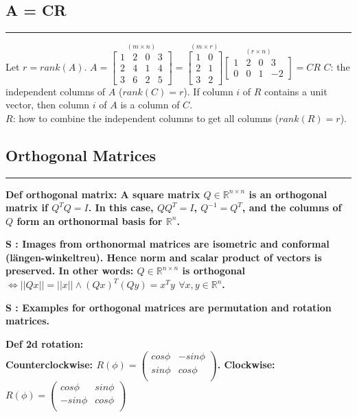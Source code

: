 \documentclass[7pt,landscape, margin = 0.1mm]{article}
\newcommand*{\mysubsection}[1]{\vspace{-2mm}\color{chaptercolor}\subsection{ #1 }
\vspace{-1mm}\hrule\vspace{1.5mm}\color{black}
\vspace{2mm}}
\newcommand{\DEF}[2]{\color{chaptercolor}\bf{Def #1}:\color{black}    \hspace{0.2cm} #2}
\newcommand{\SA}[2]{\color{chaptercolor}\bf{S #1}:\color{black}    \hspace{0.2cm} #2}
\begin{document}
\begin{multicols}{4}
\begin{flushleft}
{{\mysubsection{A = CR}
Let $r=rank(A)$.
$A=\stackrel{(m \times n)}{\begin{bmatrix}
1 & 2 & 0 & 3\\
2 & 4 & 1 & 4\\
3 & 6 & 2 & 5
\end{bmatrix}}=\stackrel{(m \times r)}{\begin{bmatrix}
1 & 0\\
2 & 1\\
3 & 2
\end{bmatrix}}\stackrel{(r \times n)}{\begin{bmatrix}
1 & 2 & 0 & 3\\
0 & 0 & 1 & -2
\end{bmatrix}}=CR$
$C$: the independent columns of $A$ ($rank(C)=r$). If column $i$ of $R$ contains a unit vector, then column $i$ of $A$ is a column of $C$.\\
$R$: how to combine the independent columns to get all columns ($rank(R)=r$).


\mysubsection{\centering Orthogonal Matrices}
\DEF{orthogonal matrix}{A square matrix $Q\in\mathbb{R}^{n\times n}$ is an orthogonal matrix if $Q^TQ=I$. In this case, $QQ^T=I$, $Q^{-1}=Q^T$, and the columns of $Q$ form an orthonormal basis for $\mathbb{R}^n$.}

\SA{}{Images from orthonormal matrices are isometric and conformal (längen-winkeltreu). Hence norm and scalar product of vectors is preserved. In other words: $Q\in\mathbb{R}^{n\times n}$ is orthogonal $\Leftrightarrow ||Qx||=||x|| \land (Qx)^T(Qy)=x^Ty$ $\forall x,y\in\mathbb{R}^n$.}

\SA{}{Examples for orthogonal matrices are permutation and rotation matrices.}

\DEF{2d rotation}{\\
Counterclockwise: $R(\phi) = \begin{pmatrix}
cos \phi & -sin \phi \\
 sin \phi & cos \phi  \\
\end{pmatrix}$. 
Clockwise: $R(\phi) = \begin{pmatrix}
cos \phi & sin \phi \\
 -sin \phi & cos \phi  \\
\end{pmatrix}$}

}}
\end{flushleft}
\end{multicols}
\end{document}
